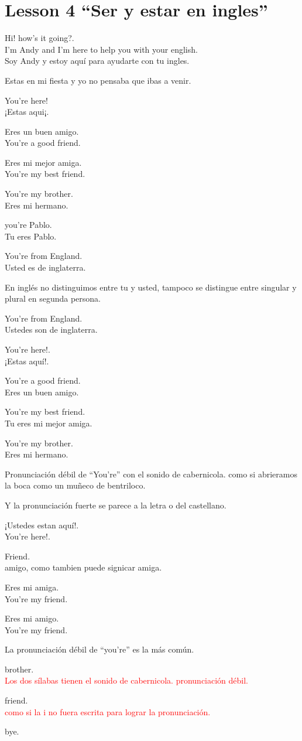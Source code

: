 \section{Lesson 4 ``Ser y estar en ingles''}

Hi! how's it going?.\\
I'm Andy and I'm here to help you with your english.\\
Soy Andy y estoy aquí para ayudarte con tu ingles.

Estas en mi fiesta y yo no pensaba que ibas a venir.

You're here!\\
¡Estas aqui¡.

Eres un buen amigo.\\
You're a good friend.

Eres mi mejor amiga.\\
You're my best friend.

You're my brother.\\
Eres mi hermano.

you're Pablo.\\
Tu eres Pablo.

You're from England.\\
Usted es de inglaterra.

En inglés no distinguimos entre tu y usted, tampoco se distingue entre
singular y plural en segunda persona.

You're from England.\\
Ustedes son de inglaterra.

You're here!.\\
¡Estas aquí!.

You're a good friend.\\
Eres un buen amigo.

You're my best friend.\\
Tu eres mi mejor amiga.

You're my brother.\\
Eres mi hermano.

Pronunciación débil de ``You're'' con el sonido de cabernicola.
como si abrieramos la boca como un muñeco de bentriloco.

Y la pronunciación fuerte se parece a la letra o del castellano.

¡Ustedes estan aquí!.\\
You're here!.

Friend.\\
amigo, como tambien puede signicar amiga.

Eres mi amiga.\\
You're my friend.

Eres mi amigo.\\
You're my friend.

La pronunciación débil de ``you're'' es la más común.

brother.\\
\textcolor{red}{Los dos sílabas tienen el sonido de cabernicola.
pronunciación débil.}

friend.\\
\textcolor{red}{como si la i no fuera escrita para lograr la pronunciación.}

bye.
